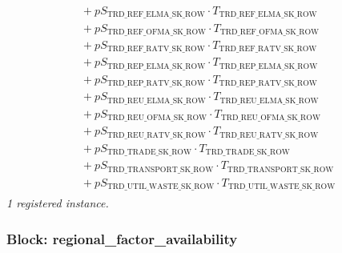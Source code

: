 \documentclass[11pt]{article}
\begin{document}
\begin{align*}
\begin{aligned}
{}+ pS_{\text{TRD\_REF\_ELMA\_SK\_ROW}} \cdot T_{\text{TRD\_REF\_ELMA\_SK\_ROW}}\\
{}+ pS_{\text{TRD\_REF\_OFMA\_SK\_ROW}} \cdot T_{\text{TRD\_REF\_OFMA\_SK\_ROW}}\\
{}+ pS_{\text{TRD\_REF\_RATV\_SK\_ROW}} \cdot T_{\text{TRD\_REF\_RATV\_SK\_ROW}}\\
{}+ pS_{\text{TRD\_REP\_ELMA\_SK\_ROW}} \cdot T_{\text{TRD\_REP\_ELMA\_SK\_ROW}}\\
{}+ pS_{\text{TRD\_REP\_RATV\_SK\_ROW}} \cdot T_{\text{TRD\_REP\_RATV\_SK\_ROW}}\\
{}+ pS_{\text{TRD\_REU\_ELMA\_SK\_ROW}} \cdot T_{\text{TRD\_REU\_ELMA\_SK\_ROW}}\\
{}+ pS_{\text{TRD\_REU\_OFMA\_SK\_ROW}} \cdot T_{\text{TRD\_REU\_OFMA\_SK\_ROW}}\\
{}+ pS_{\text{TRD\_REU\_RATV\_SK\_ROW}} \cdot T_{\text{TRD\_REU\_RATV\_SK\_ROW}}\\
{}+ pS_{\text{TRD\_TRADE\_SK\_ROW}} \cdot T_{\text{TRD\_TRADE\_SK\_ROW}}\\
{}+ pS_{\text{TRD\_TRANSPORT\_SK\_ROW}} \cdot T_{\text{TRD\_TRANSPORT\_SK\_ROW}}\\
{}+ pS_{\text{TRD\_UTIL\_WASTE\_SK\_ROW}} \cdot T_{\text{TRD\_UTIL\_WASTE\_SK\_ROW}}
\end{aligned}
\end{align*}
\noindent\emph{1 registered instance.}\par
\subsubsection*{Block: regional\_factor\_availability}
\end{document}
